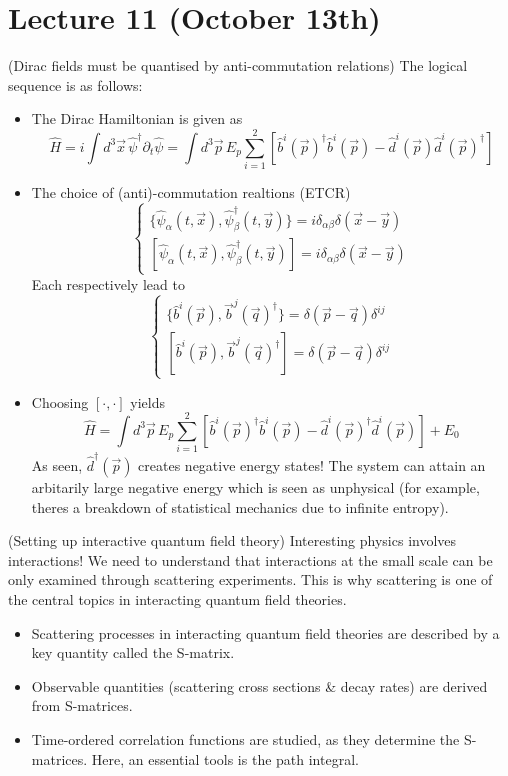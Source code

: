 \section{Lecture 11 (October 13th)}
\begin{ex}
(Dirac fields must be quantised by anti-commutation relations) The logical sequence is as follows:
\begin{itemize}
\item[(i)] The Dirac Hamiltonian is given as 
\[\hat{H}=i\int d^3\vec{x}\,\hat{\psi }^{\dagger }\partial _{t}\hat{\psi }=\int d^3\vec{p}\,E_{p}\sum _{i=1}^{2}[\hat{b}^{i}(\vec{p})^{\dagger }\hat{b}^{i}(\vec{p})-\hat{d}^{i}(\vec{p})\hat{d}^{i}(\vec{p})^{\dagger }]\]
\item[(ii)] The choice of (anti)-commutation realtions (ETCR)
\[\begin{cases}
\{\hat{\psi }_{\alpha }(t,\vec{x}),\hat{\psi }_{\beta }^{\dagger }(t,\vec{y})\}=i\delta _{\alpha \beta }\delta (\vec{x}-\vec{y})\\
[\hat{\psi }_{\alpha }(t,\vec{x}),\hat{\psi }^{\dagger }_{\beta }(t,\vec{y})]=i\delta _{\alpha \beta }\delta (\vec{x}-\vec{y})
\end{cases}\]
Each respectively lead to
\[\begin{cases}
\{\hat{b}^{i}(\vec{p}),\vec{b}^{j}(\vec{q})^{\dagger }\}=\delta (\vec{p}-\vec{q})\delta ^{ij}\\
[\hat{b}^{i}(\vec{p}),\vec{b}^{j}(\vec{q})^{\dagger }]=\delta (\vec{p}-\vec{q})\delta ^{ij}
\end{cases}\]
\item[(iii)] Choosing $[\cdot ,\cdot ]$ yields 
\[\hat{H}=\int d^3\vec{p}\,E_{p}\sum ^{2}_{i=1}[\hat{b}^{i}(\vec{p})^{\dagger }\hat{b}^{i}(\vec{p})-\hat{d}^{i}(\vec{p})^{\dagger }\hat{d}^{i}(\vec{p})]+E_{0}\]
As seen, $\hat{d}^{\dagger }(\vec{p})$ creates negative energy states! The system can attain an arbitarily large negative energy which is seen as unphysical (for example, theres a breakdown of statistical mechanics due to infinite entropy). 
\end{itemize}
\end{ex}
\vspace{2ex}
\begin{rmk}
(Setting up interactive quantum field theory) Interesting physics involves interactions! We need to understand that interactions at the small scale can be only examined through scattering experiments. This is why scattering is one of the central topics in interacting quantum field theories. 
\begin{itemize}
\item[(i)] Scattering processes in interacting quantum field theories are described by a key quantity called the S-matrix.
\item[(ii)] Observable quantities (scattering cross sections \& decay rates) are derived from S-matrices.
\item[(iii)] Time-ordered correlation functions are studied, as they determine the S-matrices. Here, an essential tools is the path integral.
\end{itemize}
\end{rmk}
